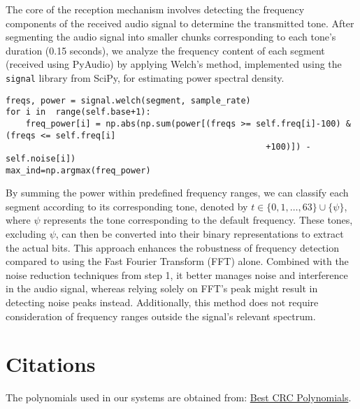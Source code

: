 \documentclass[11pt]{article}
\begin{document}
The core of the reception mechanism involves detecting the frequency components of the received audio signal to determine the transmitted tone. After segmenting the audio signal into smaller chunks corresponding to each tone's duration (0.15 seconds), we analyze the frequency content of each segment (received using PyAudio) by applying Welch's method, implemented using the \texttt{signal} library from SciPy, for estimating power spectral density.
\begin{tcolorbox}[colback=black!10!white, colframe=black]
    
\begin{verbatim} 
freqs, power = signal.welch(segment, sample_rate)
for i in  range(self.base+1):
    freq_power[i] = np.abs(np.sum(power[(freqs >= self.freq[i]-100) & (freqs <= self.freq[i]
                                                    +100)]) - self.noise[i])
max_ind=np.argmax(freq_power) \end{verbatim}
\end{tcolorbox}

By summing the power within predefined frequency ranges, we can classify each segment according to its corresponding tone, denoted by \( t \in \{0, 1, \ldots, 63\} \cup \{\psi\} \), where \(\psi\) represents the tone corresponding to the default frequency. These tones, excluding \(\psi\), can then be converted into their binary representations to extract the actual bits. This approach enhances the robustness of frequency detection compared to using the Fast Fourier Transform (FFT) alone. Combined with the noise reduction techniques from step 1, it better manages noise and interference in the audio signal, whereas relying solely on FFT's peak might result in detecting noise peaks instead. Additionally, this method does not require consideration of frequency ranges outside the signal's relevant spectrum.




\section{Citations}
The polynomials used in our systems are obtained from: \href{https://users.ece.cmu.edu/~koopman/crc/hd5.html}{Best CRC Polynomials}.
\end{document}
